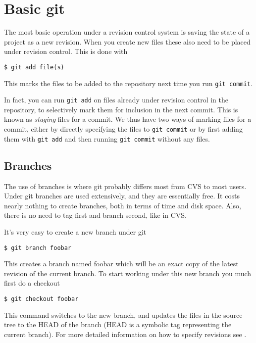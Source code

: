 \documentclass[a4paper,10pt]{article}
\begin{document}
\section{Basic git}
The most basic operation under a revision control system is saving the state of
a project as a new revision. When you create new files  
these also need to be placed under revision control. This is done with
\begin{verbatim}
$ git add file(s)
\end{verbatim}
This marks the files to be added to the repository next time you run 
\texttt{git commit}. 

In fact, you can run \texttt{git add} on files already
under revision control in the repository, to selectively mark them for
inclusion in the next commit. This is known as \emph{staging} files for a
commit. We thus have two ways of marking files for a commit, either by
directly specifying the files to \texttt{git commit} or by first adding them
with \texttt{git add} and then running \texttt{git commit} without any files. 

\subsection{Branches}
The use of branches is where git probably differs most from CVS to most users.
Under git branches are used extensively, and they are essentially
free. It costs nearly nothing to create branches, both in terms of time and
disk space. Also, there is no need to tag first and branch second, like in CVS.

It's very easy to create a new branch under git
\begin{verbatim}
$ git branch foobar
\end{verbatim}
This creates a branch named foobar which will be an exact copy of the latest
revision of the current branch. To start working under this new branch you
much first do a checkout
\begin{verbatim}
$ git checkout foobar
\end{verbatim}
This command switches to the new branch, and updates the files in the source
tree to the HEAD of the branch (HEAD is a symbolic tag representing
the current branch). For more detailed information on
how to specify revisions see .
\end{document}
